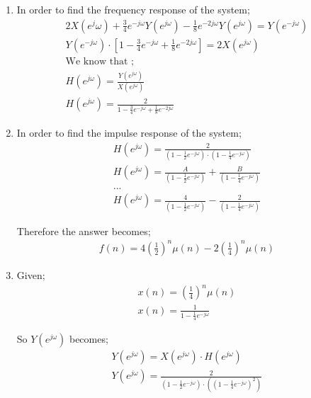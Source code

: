 \documentclass[10pt,a4paper, margin=1in]{article}
\begin{document}
\begin{enumerate}
\begin{enumerate}
    \item %
    In order to find the frequency response of the system;
    \begin{align*}
        2X(e^j\omega) + \frac{3}{4} e^{-j\omega} Y(e^{j\omega}) - \frac{1}{8} e^{-2j\omega} Y(e^{j\omega}) = Y(e^{-j\omega}) \\
        Y(e^{-j\omega}) \cdot [1 - \frac{3}{4} e^{-j\omega} + \frac{1}{8} e^{-2j\omega}] = 2X(e^{j\omega}) \\
        \text{We know that ;} \\
        H(e^{j\omega}) = \frac{Y(e^{j\omega})}{X(e^{j\omega})} \\
        H(e^{j\omega}) = \frac{2}{1 - \frac{3}{4} e^{-j\omega} + \frac{1}{8} e^{-2j\omega}}
    \end{align*}
    
    \item %
    In order to find the impulse response of the system;
    \begin{align*}
        H(e^{j\omega}) = \frac{2}{(1 - \frac{1}{2} e^{-j\omega}) \cdot (1 - \frac{1}{4} e^{-j\omega})} \\
        H(e^{j\omega}) = \frac{A}{(1 - \frac{1}{2} e^{-j\omega})} + \frac{B}{(1 - \frac{1}{4} e^{-j\omega})} \\
        ... \\
        H(e^{j\omega}) = \frac{4}{(1 - \frac{1}{2} e^{-j\omega})} - \frac{2}{(1 - \frac{1}{4} e^{-j\omega})} 
    \end{align*}
    
    Therefore the answer becomes; 
    \begin{align*}
        f(n) = 4 (\frac{1}{2})^n \mu(n) - 2 (\frac{1}{4})^n \mu(n)
    \end{align*}
    
    \item %
    Given;
    \begin{align*}
        x(n) = (\frac{1}{4})^n \mu(n) \\
        x(n) = \frac{1}{1 - \frac{1}{4} e^{-j\omega}}
    \end{align*}
    
    So $Y(e^{j\omega})$ becomes;
    \begin{align*}
        Y(e^{j\omega}) = X(e^{j\omega}) \cdot H(e^{j\omega}) \\
        Y(e^{j\omega}) = \frac{2}{(1 - \frac{1}{2} e^{-j\omega}) \cdot ((1 - \frac{1}{4} e^{-j\omega})^2)}
    \end{align*}
    

\end{enumerate}
\end{enumerate}
\end{document}
